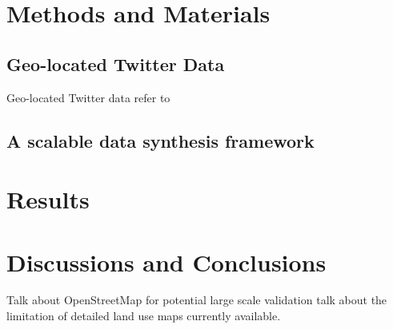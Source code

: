 \documentclass[a4paper,11pt]{article}
\begin{document}
\section{Methods and Materials}
\subsection{Geo-located Twitter Data}
Geo-located Twitter data refer to  


\subsection{A scalable data synthesis framework}



\section{Results}


\section{Discussions and Conclusions}
Talk about OpenStreetMap for potential large scale validation
talk about the limitation of detailed land use maps currently available.





\end{document}
